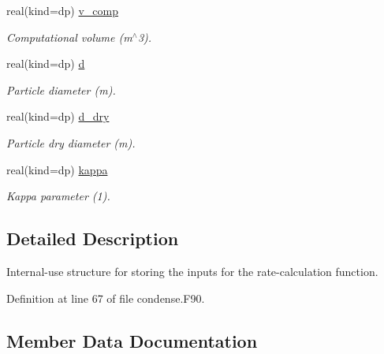\begin{DoxyCompactItemize}
real(kind=dp) \mbox{\hyperlink{structpmc__condense_1_1condense__rates__inputs__t_a88c0bdb2315d49bebf0a3df9d79ee804}{v\+\_\+comp}}
\begin{DoxyCompactList}\small\item\em Computational volume (m$^\wedge$3). \end{DoxyCompactList}\item 
real(kind=dp) \mbox{\hyperlink{structpmc__condense_1_1condense__rates__inputs__t_a19feaac836937fd26c11d6bf95684086}{d}}
\begin{DoxyCompactList}\small\item\em Particle diameter (m). \end{DoxyCompactList}\item 
real(kind=dp) \mbox{\hyperlink{structpmc__condense_1_1condense__rates__inputs__t_a4dfc3f239348e077dbadb92cd68b87a0}{d\+\_\+dry}}
\begin{DoxyCompactList}\small\item\em Particle dry diameter (m). \end{DoxyCompactList}\item 
real(kind=dp) \mbox{\hyperlink{structpmc__condense_1_1condense__rates__inputs__t_aa7af8e1b36d9f19839c15f0dabd3c61f}{kappa}}
\begin{DoxyCompactList}\small\item\em Kappa parameter (1). \end{DoxyCompactList}\end{DoxyCompactItemize}


\subsection{Detailed Description}
Internal-\/use structure for storing the inputs for the rate-\/calculation function. 

Definition at line 67 of file condense.\+F90.



\subsection{Member Data Documentation}
\mbox{\label{structpmc__condense_1_1condense__rates__inputs__t_a19feaac836937fd26c11d6bf95684086}} 
